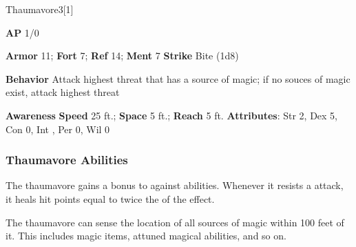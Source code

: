 \begin{monsection}{Thaumavore}{3}[1]
\vspace{-1em}\vspace{-1em}
\begin{spellcontent}
\begin{spelltargetinginfo}
{\textbf{AP} 1/0}

\pari \textbf{Armor} 11;
\textbf{Fort} 7;
\textbf{Ref} 14;
\textbf{Ment} 7
\pari \textbf{Strike} Bite  (1d8)



\pari \textbf{Behavior} Attack highest threat that has a source of magic; if no souces of magic exist, attack highest threat
\end{spelltargetinginfo}
\end{spellcontent}

\begin{monsterfooter}
\pari \textbf{Awareness} 
\pari \textbf{Speed} 25 ft.;
\textbf{Space} 5 ft.;
\textbf{Reach} 5 ft.
\pari \textbf{Attributes}:
Str 2,
Dex 5,
Con 0,
Int ,
Per 0,
Wil 0
\end{monsterfooter}
\end{monsection}


\subsubsection{Thaumavore Abilities}

The thaumavore gains a  bonus to  against  abilities.
Whenever it resists a  attack, it heals hit points equal to twice the  of the effect.

\vspace{0.5em}
The thaumavore can sense the location of all sources of magic within 100 feet of it.
This includes magic items, attuned magical abilities, and so on.

